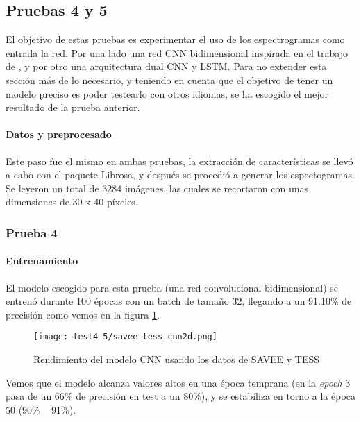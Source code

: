 \documentclass[11pt,a4paper,spanish]{book}
\begin{document}
	
	\subsection{Pruebas 4 y 5}
	El objetivo de estas pruebas es experimentar el uso de los espectrogramas como entrada la red. Por una lado una red CNN bidimensional inspirada en el trabajo de \cite{Mustaqeem2020}, y por otro una arquitectura dual CNN y LSTM. Para no extender esta sección más de lo necesario, y teniendo en cuenta que el objetivo de tener un modelo preciso es poder testearlo con otros idiomas, se ha escogido el mejor resultado de la prueba anterior.
	\paragraph{Datos y preprocesado}
	Este paso fue el mismo en ambas pruebas, la extracción de características  se llevó a cabo con el paquete Librosa, y después se procedió a generar los espectogramas. Se leyeron un total de 3284 imágenes, las cuales se recortaron con unas dimensiones de 30 x 40 píxeles.
	
	\subsubsection{Prueba 4}
	\paragraph{Entrenamiento}
	El modelo escogido para esta prueba (una red convolucional bidimensional) se entrenó durante 100 épocas con un batch de tamaño 32, llegando a un 91.10\% de precisión como vemos en la figura \ref{fig:cnn2d}. 
	\begin{figure}[H]
		\centering
		\texttt{[image: test4\_5/savee\_tess\_cnn2d.png]} 
		\caption{Rendimiento del modelo CNN usando los datos de SAVEE y TESS}
		\label{fig:cnn2d}
	\end{figure}

	Vemos que el modelo alcanza valores altos en una época temprana (en la \emph{epoch} 3  pasa de un 66\% de precisión en test a un 80\%), y se estabiliza en torno a la época 50 (90\% ~ 91\%).
	
\end{document}
